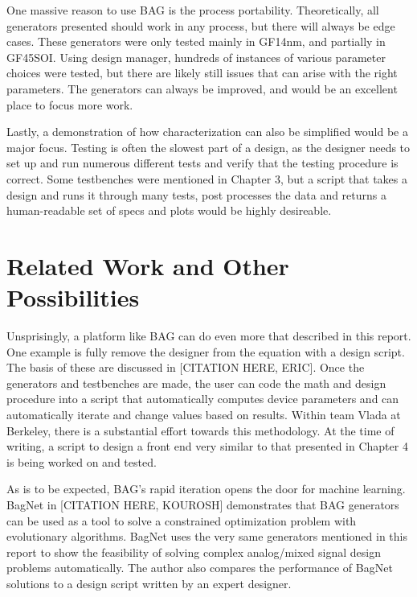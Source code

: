 One massive reason to use BAG is the process portability. Theoretically, all generators presented should work in any process, but there will always be edge cases. These generators were only tested mainly in GF14nm, and partially in GF45SOI. Using design manager, hundreds of instances of various parameter choices were tested, but there are likely still issues that can arise with the right parameters. The generators can always be improved, and would be an excellent place to focus more work.

Lastly, a demonstration of how characterization can also be simplified would be a major focus. Testing is often the slowest part of a design, as the designer needs to set up and run numerous different tests and verify that the testing procedure is correct. Some testbenches were mentioned in Chapter 3, but a script that takes a design and runs it through many tests, post processes the data and returns a human-readable set of specs and plots would be highly desireable. 
\section{Related Work and Other Possibilities}
Unsprisingly, a platform like BAG can do even more that described in this report. One example is fully remove the designer from the equation with a design script. The basis of these are discussed in [CITATION HERE, ERIC]. Once the generators and testbenches are made, the user can code the math and design procedure into a script that automatically computes device parameters and can automatically iterate and change values based on results. Within team Vlada at Berkeley, there is a substantial effort towards this methodology. At the time of writing, a script to design a front end very similar to that presented in Chapter 4 is being worked on and tested.

As is to be expected, BAG's rapid iteration opens the door for machine learning. BagNet in [CITATION HERE, KOUROSH] demonstrates that BAG generators can be used as a tool to solve a constrained optimization problem with evolutionary algorithms. BagNet uses the very same generators mentioned in this report to show the feasibility of solving complex analog/mixed signal design problems automatically. The author also compares the performance of BagNet solutions to a design script written by an expert designer.